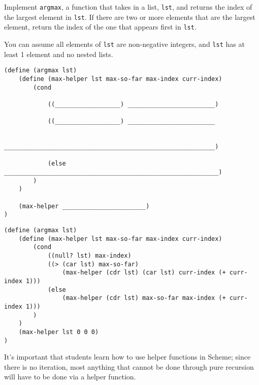 \question
Implement \lstinline{argmax}, a function that takes in a list, \lstinline{lst}, and returns the index of the largest element in \lstinline{lst}. If there are two or more elements that are the largest element, return the index of the one that appears first in \lstinline{lst}.

You can assume all elements of \lstinline{lst} are non-negative integers, and \lstinline{lst} has at least 1 element and no nested lists.

\begin{lstlisting}
(define (argmax lst)
    (define (max-helper lst max-so-far max-index curr-index)
        (cond

            ((__________________) ________________________)

            ((__________________) ________________________ 

                __________________________________________________________)

            (else ___________________________________________________________)
        )
    )

    (max-helper _______________________)
)
\end{lstlisting}

\begin{solution}
\begin{lstlisting}
(define (argmax lst)
    (define (max-helper lst max-so-far max-index curr-index)
        (cond
            ((null? lst) max-index)
            ((> (car lst) max-so-far) 
                (max-helper (cdr lst) (car lst) curr-index (+ curr-index 1)))
            (else
                (max-helper (cdr lst) max-so-far max-index (+ curr-index 1)))
        )
    )
    (max-helper lst 0 0 0)
)
\end{lstlisting}
\end{solution}

\begin{meta}
It's important that students learn how to use helper functions in Scheme; since there is no iteration, most anything that cannot be done through pure recursion will have to be done via a helper function. 
\end{meta}
